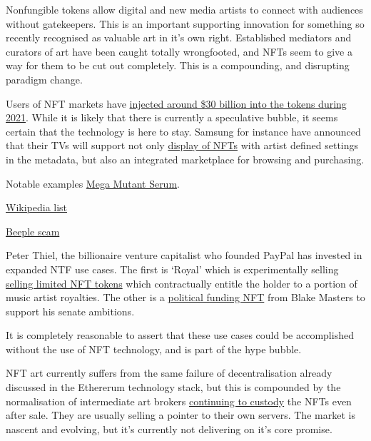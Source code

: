 Nonfungible tokens allow digital and new media artists to connect with audiences without gatekeepers. This is an important supporting innovation for something so recently recognised as valuable art in it's own right. Established mediators and curators of art have been caught totally wrongfooted, and NFTs seem to give a way for them to be cut out completely. This is a compounding, and disrupting paradigm change.\par

Users of NFT markets have \href{https://blog.chainalysis.com/reports/nft-market-report-preview-2021/}{injected around \$30 billion into the tokens during 2021}. While it is likely that there is currently a speculative bubble, it seems certain that the technology is here to stay. Samsung for instance have announced that their TVs will support not only \href{https://news.samsung.com/us/samsung-2022-micro-led-neo-qled-lifestyle-tvs-personalization-options-ces-2022/}{display of NFTs} with artist defined settings in the metadata, but also an integrated marketplace for browsing and purchasing.

Notable examples
\href{https://opensea.io/assets/0x22c36bfdcef207f9c0cc941936eff94d4246d14a/69}{Mega Mutant Serum}.

\href{https://en.wikipedia.org/wiki/List_of_most_expensive_non-fungible_tokens}{Wikipedia list}

\href{https://amycastor.com/2021/03/14/metakovan-the-mystery-beeple-art-buyer-and-his-nft-defi-scheme/}{Beeple scam}


Peter Thiel, the billionaire venture capitalist who founded PayPal has invested in expanded NTF use cases. The first is `Royal' which is experimentally  selling \href{https://royal.io/}{selling limited NFT tokens} which contractually entitle the holder to a portion of music artist royalties. The other is a \href{https://www.ztonft.com/}{political funding NFT} from Blake Masters to support his senate ambitions.

It is completely reasonable to assert that these use cases could be accomplished without the use of NFT technology, and is part of the hype bubble.

NFT art currently suffers from the same failure of decentralisation already discussed in the Ethererum technology stack, but this is compounded by the normalisation of intermediate art brokers \href{https://moxie.org/2022/01/07/web3-first-impressions.html}{continuing to custody} the NFTs even after sale. They are usually selling a pointer to their own servers. The market is nascent and evolving, but it's currently not delivering on it's core promise.


